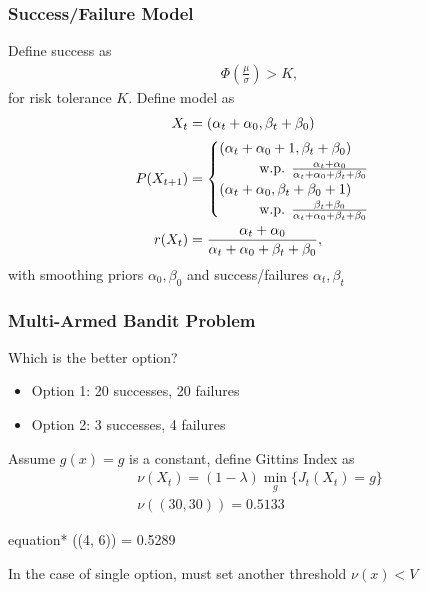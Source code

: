 \documentclass[compress, xcolor=pst]{beamer}
\newcommand\tab[1][1cm]{\hspace*{#1}}
\begin{document}
\begin{frame}
	\frametitle{\textbf{Success/Failure Model}}
	Define success as
	\begin{align*}
		\Phi(\frac{\mu}{\sigma}) > K,
	\end{align*}
	for risk tolerance $K$. Define model as
	\begin{align*}
	  X_t &= (\alpha_t + \alpha_0, \beta_t + \beta_0) \\
	  P(X_{t+1}) &=
	  \begin{cases}
	      (\alpha_t + \alpha_0 + 1, \beta_t + \beta_0)
	      \\ \tab\text{w.p. } \frac{\alpha_t + \alpha_0}{\alpha_t + \alpha_0 + \beta_t + \beta_0}\\
	      (\alpha_t + \alpha_0, \beta_t + \beta_0 + 1)
	      \\ \tab\text{w.p. } \frac{\beta_t + \beta_0}{\alpha_t + \alpha_0 + \beta_t + \beta_0}
	  \end{cases}\\
	  r(X_t) &= \frac{\alpha_t + \alpha_0}{\alpha_t + \alpha_0 + \beta_t + \beta_0},
	\end{align*}
	with smoothing priors $\alpha_0,\beta_0$ and success/failures $\alpha_t,\beta_t$
\end{frame}

\begin{frame}
	\frametitle{\textbf{Multi-Armed Bandit Problem}}
	Which is the better option?
	\begin{itemize}
		\item Option 1: 20 successes, 20 failures
		\item Option 2: 3 successes, 4 failures
	\end{itemize}
	Assume $g(x) = g$ is a constant, define Gittins Index as
	\begin{gather*}
	  \nu(X_t) = (1-\lambda)\min_{g} \{J_t(X_t) = g\}\\
	  \nu((30, 30)) = 0.5133
	\end{gather*}
	\begin{empheq}[box=\tcbhighmath]{equation*}
		\nu((4, 6)) = 0.5289
	\end{empheq}

	In the case of single option, must set another threshold $\nu(x) < V$
\end{frame}
\end{document}
